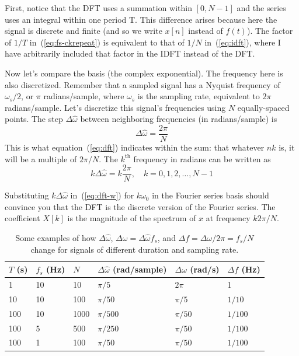 First, notice that the DFT uses a summation within $[0, N-1]$ and the
series uses an integral within one period T.  This difference arises
because here the signal is discrete and finite (and so we write $x[n]$
instead of $f(t)$). The factor of $1/T$ in~(\ref{eq:fs-ckrepeat}) is
equivalent to that of $1/N$ in~(\ref{eq:idft}), where I have
arbitrarily included that factor in the IDFT instead of the DFT.

Now let's compare the basis (the complex exponential). The frequency
here is also discretized.  Remember that a sampled signal has a
Nyquist frequency of $\omega_s/2$, or $\pi$ radians/sample, where
$\omega_s$ is the sampling rate, equivalent to $2\pi$ radians/sample.
Let's discretize this signal's frequencies using $N$ equally-spaced
points.  The step $\Delta\hat{\omega}$ between neighboring frequencies (in
radians/sample) is
\begin{equation}
\Delta\hat{\omega} = \frac{2\pi}{N}
\end{equation}
This is what equation~(\ref{eq:dft}) indicates within the sum: that
whatever $nk$ is, it will be a multiple of $2\pi/N$.  The
$k^\mathrm{th}$ frequency in radians can be written as
\begin{equation}
k \Delta\hat{\omega} = k\frac{2\pi}{N}, \quad k = 0, 1, 2, \ldots, N-1
\label{eq:dft-w}
\end{equation}

Substituting $k \Delta\hat{\omega}$ in~(\ref{eq:dft-w}) for
$k\omega_0$ in the Fourier series basis should convince you that the
DFT is the discrete version of the Fourier series. The coefficient
$X[k]$ is the magnitude of the spectrum of $x$ at frequency $k2\pi/N$.

\begin{table}
  \centering
  \begin{tabular}{|l|l|l|l|l|l|} \hline
    $T$ (s) & $f_s$ (Hz) & $N$ & $\Delta\hat{\omega}$ (rad/sample) &
    $\Delta\omega$ (rad/s) & $\Delta f$ (Hz) \\ \hline
    1    & 10    & 10    & $\pi/5$    & $2\pi$    & 1 \\
    10   & 10    & 100   & $\pi/50$   & $\pi/5$   & $1/10$ \\
    100  & 10    & 1000  & $\pi/500$  & $\pi/50$  & $1/100$ \\
    100  & 5     & 500   & $\pi/250$  & $\pi/50$  & $1/100$ \\
    100  & 1     & 100   & $\pi/50$   & $\pi/50$  & $1/100$ \\ \hline
  \end{tabular}
  \caption{Some examples of how $\Delta\hat{\omega}$,
    $\Delta\omega=\Delta\hat{\omega}f_s$, 
    and $\Delta f=\Delta\omega/2\pi = f_s/N$ change for signals of
    different duration and sampling rate.} 
  \label{tb:delta-f}
\end{table}

